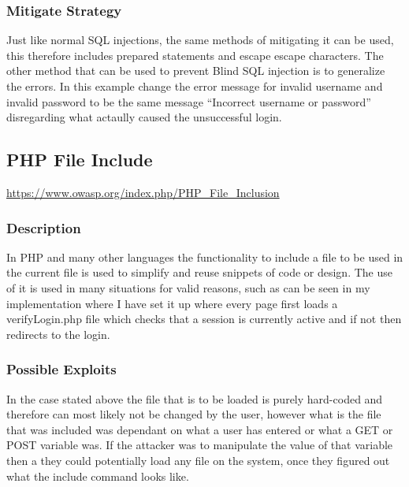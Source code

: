 \documentclass[titlepage]{article}
\begin{document}

      \subsubsection{Mitigate Strategy} %
      \label{ssub:sql_injection_blind_mitigate_strategy}
      
      Just like normal SQL injections, the same methods of mitigating it can be used, this therefore includes prepared statements and escape escape characters. The other method that can be used to prevent Blind SQL injection is to generalize the errors. In this example change the error message for invalid username and invalid password to be the same message ``Incorrect username or password'' disregarding what actaully caused the unsuccessful login.


   \subsection{PHP File Include} %
   \label{sub:php_file_include}

      \url{https://www.owasp.org/index.php/PHP_File_Inclusion}
   
      \subsubsection{Description} %
      \label{ssub:php_file_include_description}
      
      In PHP and many other languages the functionality to include a file to be used in the current file is used to simplify and reuse snippets of code or design. The use of it is used in many situations for valid reasons, such as can be seen in my implementation where I have set it up where every page first loads a verifyLogin.php file which checks that a session is currently active and if not then redirects to the login. 
   

      \subsubsection{Possible Exploits} %
      \label{ssub:php_file_include_possible_exploits}
   
      In the case stated above the file that is to be loaded is purely hard-coded and therefore can most likely not be changed by the user, however what is the file that was included was dependant on what a user has entered or what a GET or POST variable was. If the attacker was to manipulate the value of that variable then a they could potentially load any file on the system, once they figured out what the include command looks like. 
\end{document}
